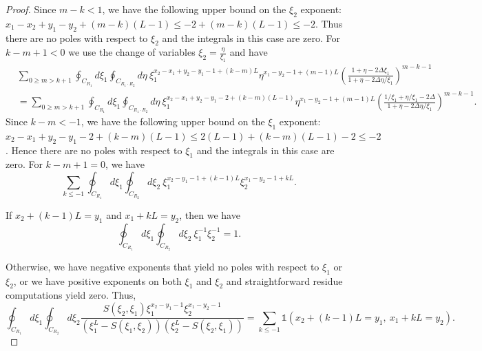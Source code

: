 \documentclass[a4paper,11pt]{article}
\theoremstyle{definition}
\begin{document}
\begin{proof}
Since $m-k<1$, we have the following upper bound on the $\xi_2$ exponent: $x_1-x_2 +y_1-y_2+(m-k)(L-1)\leq -2 + (m-k)(L-1) \leq -2$. Thus there are no poles with respect to $\xi_2$ and the integrals in this case are zero. For $k-m+1<0$ we use the change of variables $\xi_2=\frac{\eta}{\xi_1}$ and have 
\begin{equation}
    \begin{split}
        &\sum_{0\geq m>k+1}\oint_{C_{R_1}}d\xi_1\oint_{C_{R_1\cdot R_2}}d\eta \ \xi_1^{x_2-x_1+y_2-y_1-1+(k-m)L}\eta^{x_1-y_2-1+(m-1)L}\left(\frac{1+\eta-2\Delta\xi_1}{1+\eta-2\Delta\eta/\xi_1}\right)^{m-k-1} \\
        &=\sum_{0\geq m>k+1}\oint_{C_{R_1}}d\xi_1\oint_{C_{R_1\cdot R_2}}d\eta \ \xi_1^{x_2-x_1+y_2-y_1-2+(k-m)(L-1)}\eta^{x_1-y_2-1+(m-1)L}\left(\frac{1/\xi_1+\eta/\xi_1-2\Delta}{1+\eta-2\Delta\eta/\xi_1}\right)^{m-k-1}.
    \end{split}
\end{equation}
Since $k-m<-1$, we have the following upper bound on the $\xi_1$ exponent: $x_2-x_1+y_2-y_1-2 + (k-m)(L-1) \leq 2(L-1) + (k-m)(L-1)-2 \leq -2$. Hence there are no poles with respect to $\xi_1$ and the integrals in this case are zero. For $k-m+1=0$, we have
\begin{equation}
    \sum_{k\leq -1}\oint_{C_{R_1}}d\xi_1\oint_{C_{R_2}}d\xi_2 \ \xi_1^{x_2-y_1-1+(k-1)L}\xi_2^{x_1-y_2-1+kL}.
\end{equation}

If $x_2+(k-1)L=y_1$ and $x_1+kL=y_2$, then we have 
\begin{equation}
    \oint_{C_{R_1}}d\xi_1\oint_{C_{R_2}}d\xi_2 \ \xi_1^{-1}\xi_2^{-1} = 1.
\end{equation}

Otherwise, we have negative exponents that yield no poles with respect to $\xi_1$ or $\xi_2$, or we have positive exponents on both $\xi_1$ and $\xi_2$ and straightforward residue computations yield zero. Thus, 
\begin{equation}
    \oint_{C_{R_1}}d\xi_1\oint_{C_{R_2}}d\xi_2 \frac{S(\xi_2,\xi_1)\xi_1^{x_2-y_1-1}\xi_2^{x_1-y_2-1}}{\left(\xi_1^L - S(\xi_1,\xi_2) \right)\left(\xi_2^L - S(\xi_2,\xi_1) \right)} = \sum_{k\leq -1}\mathds{1}\left(x_2+(k-1)L=y_1, \ x_1+kL=y_2 \right).
\end{equation}


\end{proof}
\end{document}
